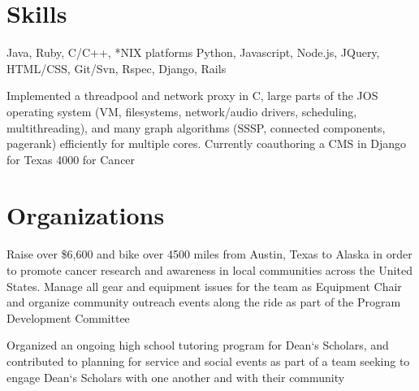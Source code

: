 \documentclass[11pt,letter,sans]{moderncv}
\begin{document}


\section{Skills}
{Java, Ruby, C/C++, *NIX platforms}
{Python, Javascript, Node.js, JQuery, HTML/CSS, Git/Svn, Rspec, Django, Rails}

{Implemented a threadpool and network proxy in C, large parts of the JOS
operating system (VM, filesystems, network/audio drivers, scheduling,
multithreading), and many graph algorithms (SSSP, connected components,
pagerank) efficiently for multiple cores. Currently coauthoring a CMS in Django
for Texas 4000 for Cancer}

\section{Organizations}
{Raise over \$6,600 and bike over 4500 miles from Austin, Texas to Alaska in
order to promote cancer research and awareness in local communities across the
United States. Manage all gear and equipment issues for the team as Equipment
Chair and organize community outreach events along the ride as part of the
Program Development Committee}

{Organized an ongoing high school tutoring program for Dean`s Scholars, and
contributed to planning for service and social events as part of a team seeking
to engage Dean`s Scholars with one another and with their community}
\end{document}
